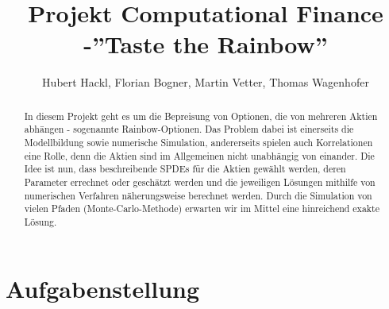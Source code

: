 \documentclass[12pt]{article}
\title{Projekt Computational Finance -''Taste the Rainbow''}
\author{Hubert Hackl, Florian Bogner, Martin Vetter, Thomas Wagenhofer}
\begin{document}
\maketitle

\begin{abstract}
In diesem Projekt geht es um die Bepreisung von Optionen, die von mehreren Aktien abhängen - sogenannte Rainbow-Optionen. Das Problem dabei ist einerseits die Modellbildung sowie numerische Simulation, andererseits spielen auch Korrelationen eine Rolle, denn die Aktien sind im Allgemeinen nicht unabhängig von einander. Die Idee ist nun, dass beschreibende SPDEs für die Aktien gewählt werden, deren Parameter errechnet oder geschätzt werden und die jeweiligen Lösungen mithilfe von numerischen Verfahren näherungsweise berechnet werden. Durch die Simulation von vielen Pfaden (Monte-Carlo-Methode) erwarten wir im Mittel eine hinreichend exakte Lösung.
\end{abstract}


\section*{Aufgabenstellung}
\end{document}
